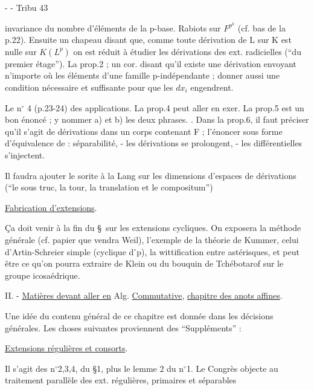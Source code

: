 -  -
Tribu 43

invariance du nombre d'éléments de la p-base. Rabiots sur $F^{p^k}$ (cf. bas de la p.22). Ensuite un chapeau disant que, comme toute dérivation de L sur K est nulle sur $K(L^p)$ on est réduit à étudier les dérivations des ext. radicielles (``du premier étage''). La prop.2 ; un cor. disant qu'il existe une dérivation envoyant n'importe où les éléments d'une famille p-indépendante ; donner aussi une condition nécessaire et suffisante pour que les $dx_i$ engendrent.

Le n$^\circ$ 4 (p.23-24) des applications. La prop.4 peut aller en exer. La prop.5 est un bon énoncé ; y nommer a) et b) les deux phrases. . Dans la prop.6, il faut préciser qu'il s'agit de dérivations dans un corps contenant F ; l'énoncer sous forme d'équivalence de : séparabilité, - les dérivations se prolongent, - les différentielles s'injectent.

Il faudra ajouter le sorite à la Lang sur les dimensions d'espaces de dérivations (``le sous truc, la tour, la translation et le compositum'')

\uline{Fabrication d'extensions}.

Ça doit venir à la fin du \S\ sur les extensions cycliques. On exposera la méthode générale (cf. papier que vendra Weil), l'exemple de la théorie de Kummer, celui d'Artin-Schreier simple (cyclique d$^\circ$p), la wittification entre astérisques, et peut être ce qu'on pourra extraire de Klein ou du bouquin de Tchébotarof sur le groupe icosaédrique.

II. - \uline{Matières devant aller en} Alg. \uline{Commutative}, \uline{chapitre des anots affines}.

Une idée du contenu général de ce chapitre est donnée dans les décisions générales. Les choses suivantes proviennent des ``Suppléments'' :

\uline{Extensions régulières et consorts}.

Il s'agit des n$^\circ$2,3,4, du \S1, plus le lemme 2 du n$^\circ$1. Le Congrès objecte au traitement parallèle des ext. régulières, primaires et séparables

